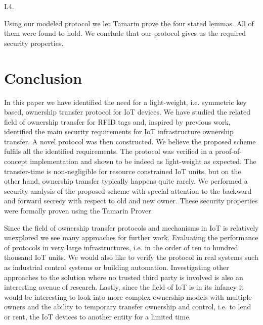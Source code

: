 {\begin{labeling}{L4.}
	
\end{labeling}


Using our modeled protocol we let Tamarin prove the four stated lemmas. All of them were found to hold. We conclude that our protocol gives us the required security properties. 


\section{Conclusion}
\label{Conclusion}
In this paper we have identified the need for a light-weight, i.e. symmetric key based, ownership transfer protocol for IoT devices. We have studied the related field of ownership transfer for RFID tags and, inspired by previous work, identified the main security requirements for IoT infrastructure ownership transfer. A novel protocol was then constructed. We believe the proposed scheme fulfils all the identified requirements. The protocol was verified in a proof-of-concept implementation and shown to be indeed as light-weight as expected. The transfer-time is non-negligible for resource constrained IoT units, but on the other hand, ownership transfer typically happens quite rarely.  We performed a security analysis of the proposed scheme with special attention to the backward and forward secrecy with respect to old and new owner. These security properties were formally proven using the Tamarin Prover. 

Since the field of ownership transfer protocols and mechanisms in IoT is relatively unexplored we see many approaches for further work. Evaluating the performance of protocols in very large infrastructures, i.e. in the order of ten to hundred thousand IoT units. We would also like to verify the protocol in real systems such as industrial control systems or building automation. Investigating other approaches to the solution where no trusted third party is involved is also an interesting avenue of research. Lastly, since the field of IoT is in its infancy it would be interesting to look into more complex ownership models with multiple owners and the ability to temporary transfer ownership and control, i.e. to lend or rent, the IoT devices to another entity for a limited time.

{\raggedright
        \printbibliography[segment=\therefsegment,heading=subbibliography]
}
}





